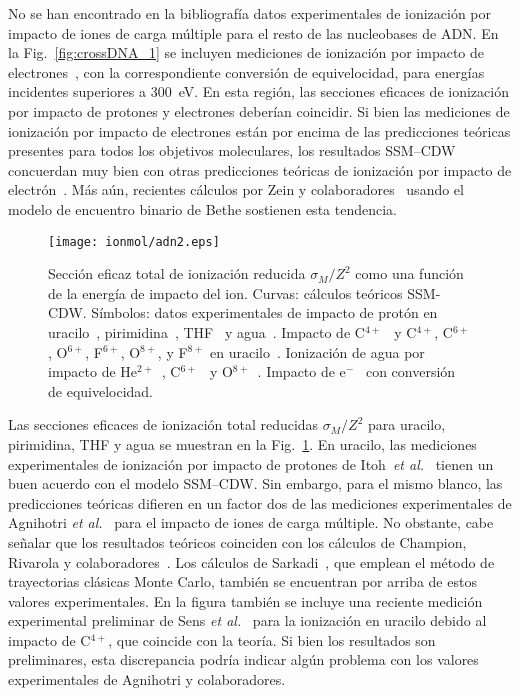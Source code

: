 No se han encontrado en la bibliografía datos experimentales de 
ionización por impacto de iones de carga múltiple para el resto de las 
nucleobases de ADN. En la Fig.~\ref{fig:crossDNA_1} se incluyen 
mediciones de ionización por impacto de electrones~\cite{Rahman:16}, con 
la correspondiente conversión de equivelocidad, para energías incidentes 
superiores a 300~eV. En esta región, las secciones eficaces de 
ionización por impacto de protones y electrones deberían coincidir. Si 
bien las mediciones de ionización por impacto de electrones están por 
encima de las predicciones teóricas presentes para todos los objetivos 
moleculares, los resultados SSM--CDW concuerdan muy bien con otras 
predicciones teóricas de ionización por impacto de 
electrón~\cite{mozejko2003,tan2018}. Más aún, recientes cálculos por 
Zein y colaboradores~\cite{Zein:21} usando el modelo de encuentro 
binario de Bethe sostienen esta tendencia.

\begin{figure}
\centering
\texttt{[image: ionmol/adn2.eps]}
\caption[Sección eficaz total de ionización reducida por $Z$ 
(Parte II).]
{Sección eficaz total de ionización reducida $\sigma_{M}/Z^2$ como 
una función de la energía de impacto del ion. 
Curvas: cálculos teóricos SSM-CDW. 
Símbolos: datos experimentales de impacto de protón en 
uracilo~\cite{itoh2013}, 
pirimidina~\cite{wolff2014}, THF~\cite{wang2016} y agua~\cite{Luna2007,
Bolorizadeh86,H_Rudd85,toburen80}. Impacto de C$^{4+}$~\cite{Sens:20} y 
C$^{4+}$, C$^{6+}$, O$^{6+}$, F$^{6+}$, O$^{8+}$, y F$^{8+}$ en 
uracilo~\cite{agnihotri2012,agnihotri2013}. Ionización de agua por 
impacto de He$^{2+}$~\cite{Ohsawa05,He_Rudd85,toburen80}, 
C$^{6+}$~\cite{DalCappello:09,Bhattacharjee:17} y 
O$^{8+}$~\cite{Bhattacharjee:16}. 
Impacto de e$^-$~\cite{bug2017,wolf2019,fuss2009} con conversión de 
equivelocidad.}
\label{fig:crossDNA_2}
\end{figure} 

Las secciones eficaces de ionización total reducidas $\sigma_M/Z^2$ 
para uracilo, pirimidina, THF y agua se muestran en la 
Fig.~\ref{fig:crossDNA_2}. En uracilo, las mediciones experimentales de 
ionización por impacto de protones de 
Itoh~\textit{et al.}~\cite{itoh2013} tienen un buen acuerdo con el 
modelo SSM--CDW. Sin embargo, para el mismo blanco, las predicciones 
teóricas difieren en un factor dos de las mediciones experimentales de 
Agnihotri \textit{et al.}~\cite{agnihotri2012,agnihotri2013} para el 
impacto de iones de carga múltiple. No obstante, cabe señalar que los 
resultados teóricos coinciden con los cálculos de Champion, 
Rivarola y colaboradores~\cite{agnihotri2012,champion2012}. Los cálculos 
de Sarkadi~\cite{sarkadi2016}, que emplean el método de trayectorias 
clásicas Monte Carlo, también se encuentran por arriba de estos valores 
experimentales. En la figura también se incluye una reciente medición 
experimental preliminar de Sens \textit{et al.}~\cite{Sens:20} para la 
ionización en uracilo debido al impacto de C$^{4+}$, que coincide con la 
teoría. Si bien los resultados son preliminares, esta discrepancia 
podría indicar algún problema con los valores experimentales de 
Agnihotri y colaboradores. 

